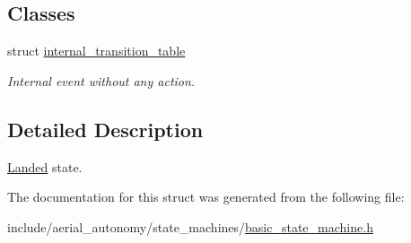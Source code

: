 \subsection*{Classes}
\begin{DoxyCompactItemize}
\item 
struct \hyperlink{structLogicStateMachineFrontEnd_1_1Landed_1_1internal__transition__table}{internal\-\_\-transition\-\_\-table}
\begin{DoxyCompactList}\small\item\em Internal event without any action. \end{DoxyCompactList}\end{DoxyCompactItemize}


\subsection{Detailed Description}
\hyperlink{structLogicStateMachineFrontEnd_1_1Landed}{Landed} state. 

The documentation for this struct was generated from the following file\-:\begin{DoxyCompactItemize}
\item 
include/aerial\-\_\-autonomy/state\-\_\-machines/\hyperlink{basic__state__machine_8h}{basic\-\_\-state\-\_\-machine.\-h}\end{DoxyCompactItemize}
